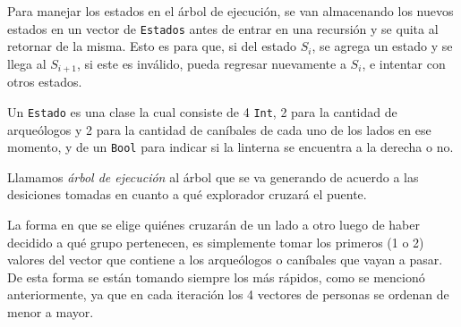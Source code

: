             Para manejar los estados en el árbol de ejecución, se van almacenando los nuevos estados en un vector de \texttt{Estados} antes de entrar en una recursión y se quita al retornar de la misma. Esto es para que, si del estado $S_{i}$, se agrega un estado y se llega al $S_{i+1}$, si este es inválido, pueda regresar nuevamente a $S_{i}$, e intentar con otros estados.

            Un \texttt{Estado} es una clase la cual consiste de 4 \texttt{Int}, 2 para la cantidad de arqueólogos y 2 para la cantidad de caníbales de cada uno de los lados en ese momento, y de un \texttt{Bool} para indicar si la linterna se encuentra a la derecha o no.

            Llamamos \emph{árbol de ejecución} al árbol que se va generando de acuerdo a las desiciones tomadas en cuanto a qué explorador cruzará el puente.

            La forma en que se elige quiénes cruzarán de un lado a otro luego de haber decidido a qué grupo pertenecen, es simplemente tomar los primeros (1 o 2) valores del vector que contiene a los arqueólogos o caníbales que vayan a pasar. De esta forma se están tomando siempre los más rápidos, como se mencionó anteriormente, ya que en cada iteración los 4 vectores de personas se ordenan de menor a mayor.

